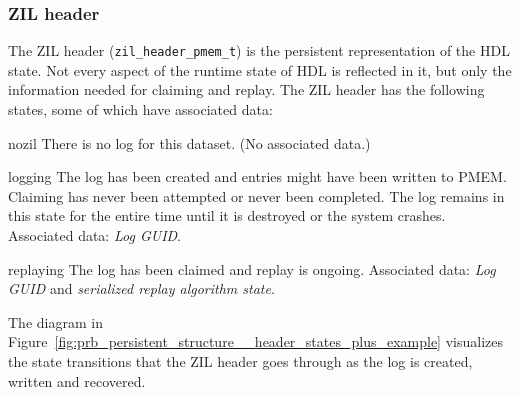 \documentclass[12pt,a4paper,twoside]{book}
\begin{document}
\subsubsection{ZIL header}\label{di:prb:persistent:zilheader}
The ZIL header (\lstinline{zil_header_pmem_t}) is the persistent representation of the HDL state.
Not every aspect of the runtime state of HDL is reflected in it, but only the information needed for claiming and replay.
The ZIL header has the following states, some of which have associated data:
\begin{description}[noitemsep,leftmargin=1.5cm,labelindent=1cm]
    \item[nozil] There is no log for this dataset. (No associated data.)
    \item[logging] The log has been created and entries might have been written to PMEM.
        Claiming has never been attempted or never been completed.
        The log remains in this state for the entire time until it is destroyed or the system crashes. Associated data: \textit{Log GUID}.
    \item[replaying] The log has been claimed and replay is ongoing. Associated data: \textit{Log GUID} and \textit{serialized replay algorithm state}.
\end{description}
The diagram in Figure~\ref{fig:prb_persistent_structure__header_states_plus_example} visualizes the state transitions that the ZIL header goes through as the log is created, written and recovered.
\end{document}
